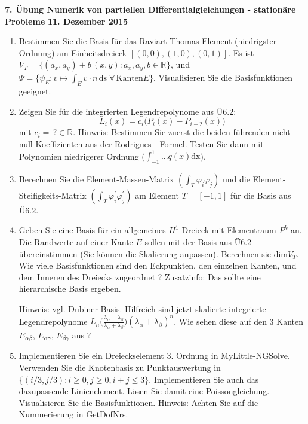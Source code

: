 \documentclass[11pt,a4paper]{report}
\newcommand{\R}[1]{\mathbb{R}^{#1}}
\begin{document}
\begin{center}
\textbf{7. \"Ubung Numerik von partiellen Differentialgleichungen - station\"are Probleme} \newline 
\textbf{11. Dezember 2015}
\end{center}
\begin{enumerate}

\item
Bestimmen Sie die Basis f\"ur das Raviart Thomas Element (niedrigster
Ordnung) am Einheitsdreieck $[(0,0), (1,0), (0,1)]$. Es ist $V_T = \{
(a_x, a_y) + b\, (x,y) : a_x, a_y, b \in \R{} \}$, und $\Psi = \{ \psi_E
: v \mapsto \int_E v \cdot n \, \text{ds}  \; \forall \, \text{Kanten
} E \}$. Visualisieren Sie die Basisfunktionen geeignet.


\item Zeigen Sie f\"ur die integrierten Legendrepolynome aus \"U6.2:
$$
L_i(x) = c_i \big(  P_i(x) - P_{i-2} (x) \big)
$$
mit $c_i = \, ? \in \R{}$. Hinweis: Bestimmen Sie zuerst die beiden f\"uhrenden
nicht-null Koeffizienten aus der Rodrigues  - Formel. Testen Sie dann
mit Polynomien niedrigerer Ordnung ($\int_{-1}^1 ... q(x) \text{dx}$). 

\item Berechnen Sie die Element-Massen-Matrix $(\int_T \varphi_i
  \varphi_j )$ und die Element-Steifigkeits-Matrix $(\int_T \varphi_i^\prime
  \varphi_j^\prime )$ am Element $T = [-1,1]$ f\"ur die Basis
  aus \"U6.2. 


\item 
Geben Sie eine Basis f\"ur ein allgemeines $H^1$-Dreieck mit Elementraum $P^k$ an.
Die Randwerte auf einer Kante $E$ sollen mit der Basis aus \"U6.2
  \"ubereinstimmen (Sie k\"onnen die Skalierung anpassen). 
Berechnen sie $\text{dim} V_T$.
Wie viele Basisfunktionen sind den Eckpunkten,
den einzelnen  Kanten, und dem Inneren des Dreiecks zugeordnet ?
Zusatzinfo: Das sollte eine hierarchische Basis ergeben.

Hinweis: vgl. Dubiner-Basis. Hilfreich sind jetzt skalierte
integrierte Legendrepolynome $L_n\big(
\frac{\lambda_\alpha-\lambda_\beta}{\lambda_\alpha+\lambda_\beta}\big)
(\lambda_\alpha+\lambda_\beta)^n$. Wie sehen diese auf den 3 Kanten
$E_{\alpha \beta}$, 
$E_{\alpha \gamma}$, 
$E_{\beta \gamma}$ aus ?


\item 
Implementieren Sie ein Dreieckselement 3. Ordnung in
MyLittle-NGSolve. Verwenden Sie die Knotenbasis zu Punktauswertung in
$\{ (i/3, j/3) : i \geq 0, j \geq 0, i+j \leq 3 \}$. Implementieren
Sie auch das dazupassende Linienelement.
L\"osen Sie damit eine Poissongleichung.
Visualisieren Sie die Basisfunktionen.  
Hinweis: Achten Sie auf die Nummerierung in GetDofNrs.


\end{enumerate}
\end{document}
